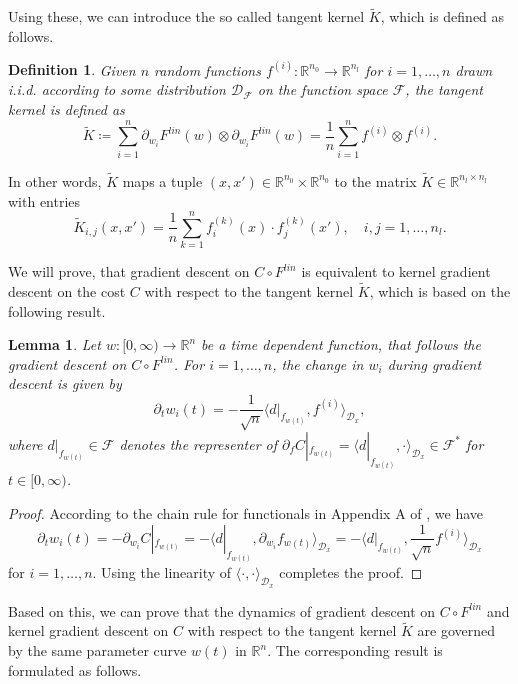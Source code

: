 \documentclass[11pt, a4paper]{article}
\newtheorem{lemma}[theorem]{Lemma}
\newtheorem{definition}[theorem]{Definition}
\newcommand{\R}{\mathbb{R}}
\newcommand{\D}{\mathcal{D}}
\newcommand{\F}{\mathcal{F}}
\begin{document}
Using these, we can introduce the so called tangent kernel $\tilde{K}$, which is defined as follows.

\begin{definition}
Given $n$ random functions $f^{(i)} : \R^{n_0} \to \R^{n_l}$ for $i=1,\dots,n$ drawn i.i.d. according to some distribution $\D_{\F}$ on the function space $\F$, the tangent kernel is defined as
\[ \tilde{K} \coloneq \sum_{i=1}^{n} \partial_{w_i} F^\textit{lin}(w) \otimes \partial_{w_i} F^\textit{lin}(w) = \frac{1}{n} \sum_{i=1}^{n} f^{(i)} \otimes f^{(i)}. \]
\end{definition}

In other words, $\tilde{K}$ maps a tuple $(x,x') \in \R^{n_0} \times \R^{n_0}$ to the matrix $\tilde{K} \in \R^{n_l \times n_l}$ with entries 
\[ \tilde{K}_{i,j}(x,x') = \frac{1}{n} \sum_{k=1}^{n} f_i^{(k)}(x) \cdot f_j^{(k)}(x'), \quad  i,j=1,\dots,n_l. \]

We will prove, that gradient descent on $C \circ F^\textit{lin}$ is equivalent to kernel gradient descent on the cost $C$ with respect to the tangent kernel $\tilde{K}$, which is based on the following result.

\begin{lemma} \label{lem:evolution}
Let $w: [0, \infty) \to \R^n$ be a time dependent function, that follows the gradient descent on $C \circ F^\textit{lin}$. For $i=1, \dots, n$, the change in $w_i$ during gradient descent is given by
\[ \partial_tw_i(t) = - \frac{1}{\sqrt{n}} \big \langle d|_{f_{w(t)}}, f^{(i)} \big \rangle_{\D_x}, \]
where $d|_{f_{w(t)}} \in \F$ denotes the representer of $\partial_f C|_{f_{w(t)}} = \big \langle d|_{f_{w(t)}}, \cdot \big \rangle_{\D_x} \in \F^*$ for $t \in [0,\infty)$.
\end{lemma}

\begin{proof}
According to the chain rule for functionals in Appendix A of \cite{Functionals}, we have
\[ \partial_tw_i(t) = - \partial_{w_{i}} C|_{f_{w(t)}} = - \big \langle d|_{f_{w(t)}}, \partial_{w_i} f_{w(t)} \big \rangle_{\D_x} = - \big \langle d|_{f_{w(t)}}, \frac{1}{\sqrt{n}} f^{(i)} \big \rangle_{\D_x} \]
for $i = 1, \dots, n$. Using the linearity of $\langle \cdot, \cdot \rangle_{\D_x}$ completes the proof.
\end{proof}

Based on this, we can prove that the dynamics of gradient descent on $C \circ F^\textit{lin}$ and kernel gradient descent on $C$ with respect to the tangent kernel $\tilde{K}$ are governed by the same parameter curve $w(t)$ in $\R^n$. The corresponding result is formulated as follows.
\end{document}
